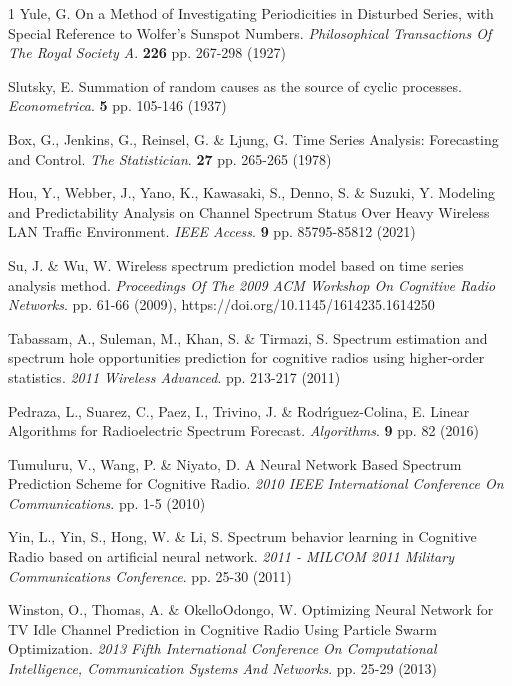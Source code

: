 \documentclass[lettersize,journal]{IEEEtran}
\begin{document}
\begin{thebibliography}{1}
Yule, G. On a Method of Investigating Periodicities in Disturbed Series, with Special Reference to Wolfer's Sunspot Numbers. {\em Philosophical Transactions Of The Royal Society A}. \textbf{226} pp. 267-298 (1927)

Slutsky, E. Summation of random causes as the source of cyclic processes. {\em Econometrica}. \textbf{5} pp. 105-146 (1937)

Box, G., Jenkins, G., Reinsel, G. \& Ljung, G. Time Series Analysis: Forecasting and Control. {\em The Statistician}. \textbf{27} pp. 265-265 (1978)

Hou, Y., Webber, J., Yano, K., Kawasaki, S., Denno, S. \& Suzuki, Y. Modeling and Predictability Analysis on Channel Spectrum Status Over Heavy Wireless LAN Traffic Environment. {\em IEEE Access}. \textbf{9} pp. 85795-85812 (2021)

Su, J. \& Wu, W. Wireless spectrum prediction model based on time series analysis method. {\em Proceedings Of The 2009 ACM Workshop On Cognitive Radio Networks}. pp. 61-66 (2009), https://doi.org/10.1145/1614235.1614250

Tabassam, A., Suleman, M., Khan, S. \& Tirmazi, S. Spectrum estimation and spectrum hole opportunities prediction for cognitive radios using higher-order statistics. {\em 2011 Wireless Advanced}. pp. 213-217 (2011)

Pedraza, L., Suarez, C., Paez, I., Trivino, J. \& Rodr{\'\i}guez-Colina, E. Linear Algorithms for Radioelectric Spectrum Forecast. {\em Algorithms}. \textbf{9} pp. 82 (2016)

Tumuluru, V., Wang, P. \& Niyato, D. A Neural Network Based Spectrum Prediction Scheme for Cognitive Radio. {\em 2010 IEEE International Conference On Communications}. pp. 1-5 (2010)

Yin, L., Yin, S., Hong, W. \& Li, S. Spectrum behavior learning in Cognitive Radio based on artificial neural network. {\em 2011 - MILCOM 2011 Military Communications Conference}. pp. 25-30 (2011)

Winston, O., Thomas, A. \& OkelloOdongo, W. Optimizing Neural Network for TV Idle Channel Prediction in Cognitive Radio Using Particle Swarm Optimization. {\em 2013 Fifth International Conference On Computational Intelligence, Communication Systems And Networks}. pp. 25-29 (2013)


\end{thebibliography}
\end{document}
